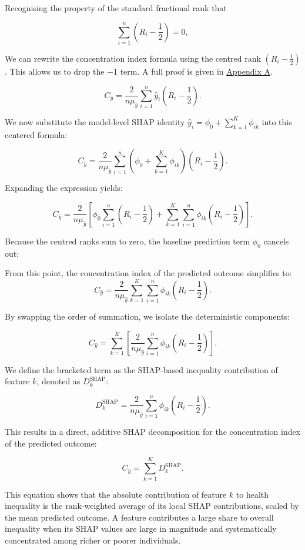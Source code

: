 \documentclass[
  11pt,
  a4paper,
]{article}
\begin{document}
Recognising the property of the standard fractional rank that

\[
\sum_{i=1}^n \left(R_i - \frac{1}{2}\right)=0,
\]

We can rewrite the concentration index formula using the centred rank
\((R_i - \frac{1}{2})\). This allows us to drop the \(-1\) term. A full
proof is given in \hyperref[app-centered-rank-proof]{Appendix A}.

\[
C_{\hat{y}} = \frac{2}{n\mu_{\hat{y}}}\sum_{i=1}^n \hat{y}_i \left(R_i - \frac{1}{2}\right).
\]

We now substitute the model-level SHAP identity
\(\hat{y}_i = \phi_0 + \sum_{k=1}^K \phi_{ik}\) into this centered
formula:

\[
C_{\hat{y}} = \frac{2}{n\mu_{\hat{y}}} \sum_{i=1}^n \left( \phi_0 + \sum_{k=1}^K \phi_{ik} \right) \left(R_i - \frac{1}{2}\right).
\]

Expanding the expression yields:

\[
C_{\hat{y}} = \frac{2}{n\mu_{\hat{y}}} \left[ \phi_0 \sum_{i=1}^n \left(R_i - \frac{1}{2}\right) + \sum_{k=1}^K \sum_{i=1}^n \phi_{ik}\left(R_i - \frac{1}{2}\right) \right].
\]

Because the centred ranks sum to zero, the baseline prediction term
\(\phi_0\) cancels out:

From this point, the concentration index of the predicted outcome
simplifies to: \[
C_{\hat{y}} = \frac{2}{n\mu_{\hat{y}}} \sum_{k=1}^K \sum_{i=1}^n \phi_{ik} \left(R_i - \frac{1}{2}\right).
\]

By swapping the order of summation, we isolate the deterministic
components:

\[
C_{\hat{y}} = \sum_{k=1}^K \left[ \frac{2}{n\mu_{\hat{y}}} \sum_{i=1}^n \phi_{ik} \left(R_i - \frac{1}{2}\right) \right].
\]

We define the bracketed term as the SHAP-based inequality contribution
of feature \(k\), denoted as \(D_k^{\text{SHAP}}\):

\[
D_k^{\text{SHAP}} = \frac{2}{n\mu_{\hat{y}}} \sum_{i=1}^n \phi_{ik} \left(R_i - \frac{1}{2}\right).
\]

This results in a direct, additive SHAP decomposition for the
concentration index of the predicted outcome:

\[
C_{\hat{y}} = \sum_{k=1}^K D_k^{\text{SHAP}}.
\]

This equation shows that the absolute contribution of feature \(k\) to
health inequality is the rank-weighted average of its local SHAP
contributions, scaled by the mean predicted outcome. A feature
contributes a large share to overall inequality when its SHAP values are
large in magnitude and systematically concentrated among richer or
poorer individuals.
\end{document}
